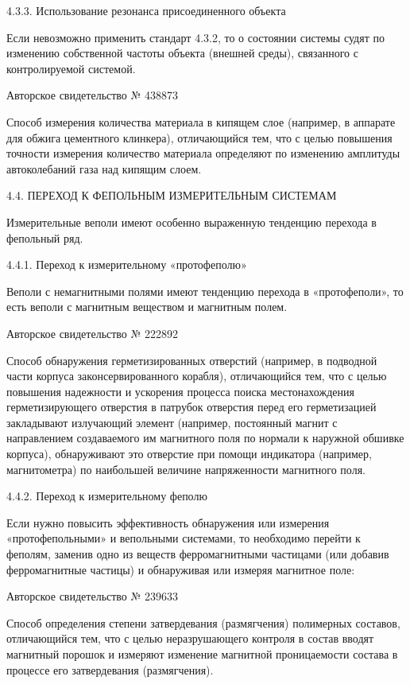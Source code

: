 4.3.3. Использование резонанса присоединенного объекта

Если невозможно применить стандарт 4.3.2, то о состоянии системы судят
по изменению собственной частоты объекта (внешней среды), связанного с
контролируемой системой.


Авторское свидетельство № 438873

Способ  измерения количества  материала  в кипящем  слое (например,  в
аппарате  для обжига  цементного  клинкера), отличающийся  тем, что  с
целью повышения точности измерения  количество материала определяют по
изменению амплитуды автоколебаний газа над кипящим слоем.


4.4. ПЕРЕХОД К ФЕПОЛЬНЫМ ИЗМЕРИТЕЛЬНЫМ СИСТЕМАМ

Измерительные веполи  имеют особенно  выраженную тенденцию  перехода в
фепольный ряд.


4.4.1. Переход к измерительному «протофеполю»

Веполи с немагнитными полями имеют тенденцию перехода в «протофеполи»,
то есть веполи с магнитным веществом и магнитным полем.


Авторское свидетельство № 222892

Способ обнаружения герметизированных  отверстий (например, в подводной
части   корпуса   законсервированного  корабля),   отличающийся   тем,
что  с   целью  повышения  надежности  и   ускорения  процесса  поиска
местонахождения  герметизирующего   отверстия  в   патрубок  отверстия
перед  его  герметизацией  закладывают излучающий  элемент  (например,
постоянный магнит  с направлением  создаваемого им магнитного  поля по
нормали к  наружной обшивке  корпуса), обнаруживают это  отверстие при
помощи  индикатора  (например,  магнитометра) по  наибольшей  величине
напряженности магнитного поля.


4.4.2. Переход к измерительному феполю

Если   нужно   повысить   эффективность  обнаружения   или   измерения
«протофепольными»  и вепольными  системами,  то  необходимо перейти  к
феполям,  заменив  одно  из  веществ  ферромагнитными  частицами  (или
добавив ферромагнитные  частицы) и  обнаруживая или  измеряя магнитное
поле:


Авторское свидетельство № 239633

Способ  определения  степени  затвердевания  (размягчения)  полимерных
составов,  отличающийся  тем,  что  с  целью  неразрушающего  контроля
в  состав  вводят магнитный  порошок  и  измеряют изменение  магнитной
проницаемости состава в процессе его затвердевания (размягчения).


